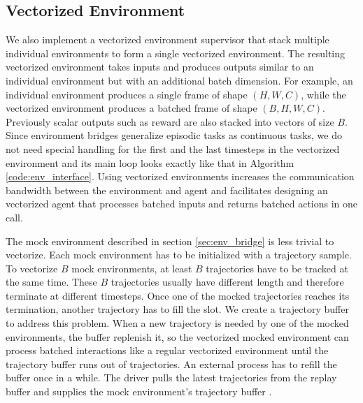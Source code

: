 \subsection{Vectorized Environment} \label{sec:vec_env}
We also implement a vectorized environment supervisor that stack multiple individual environments to form a single vectorized environment.
The resulting vectorized environment takes inputs and produces outputs similar to an individual environment but with an additional batch dimension.
For example, an individual environment produces a single frame of shape $(H, W, C)$, while the vectorized environment produces a batched frame of shape $(B, H, W, C)$.
Previously scalar outputs such as reward are also stacked into vectors of size $B$.
Since environment bridges generalize episodic tasks as continuous tasks, we do not need special handling for the first and the last timesteps in the vectorized environment and its main loop looks exactly like that in Algorithm \ref{code:env_interface}.
Using vectorized environments increases the communication bandwidth between the environment and agent and facilitates designing an vectorized agent that processes batched inputs and returns batched actions in one call.

The mock environment described in section \ref{sec:env_bridge} is less trivial to vectorize.
Each mock environment has to be initialized with a trajectory sample.
To vectorize $B$ mock environments, at least $B$ trajectories have to be tracked at the same time.
These $B$ trajectories usually have different length and therefore terminate at different timesteps.
Once one of the mocked trajectories reaches its termination, another trajectory has to fill the slot.
We create a trajectory buffer to address this problem.
When a new trajectory is needed by one of the mocked environments, the buffer replenish it,
so the vectorized mocked environment can process batched interactions like a regular vectorized environment until the trajectory buffer runs out of trajectories.
An external process has to refill the buffer once in a while.
The driver pulls the latest trajectories from the replay buffer and supplies the mock environment's trajectory buffer .

